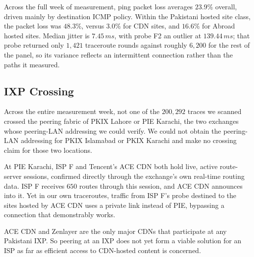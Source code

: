 \documentclass[sigconf,anonymous,10pt]{acmart}
\begin{document}
Across the full week of measurement, ping packet loss averages $23.9\%$ overall, driven mainly by destination ICMP policy. Within the Pakistani hosted site class, the packet loss was $48.3\%$, versus $3.0\%$ for CDN sites, and $16.6\%$ for Abroad hosted sites. Median jitter is $7.45\,ms$, with probe F2 an outlier at $139.44\,ms$; that probe returned only $1{,}421$ traceroute rounds against roughly $6{,}200$ for the rest of the panel, so its variance reflects an intermittent connection rather than the paths it measured.





\subsection{IXP Crossing }
\label{sec:rq1}

Across the entire measurement week, not one of the $200,292$ traces we scanned crossed the peering fabric of PKIX Lahore or PIE Karachi, the two exchanges whose peering-LAN addressing we could verify. We could not obtain the peering-LAN addressing for PKIX Islamabad or PKIX Karachi and make no crossing claim for those two locations. %

At PIE Karachi, ISP F and Tencent's ACE CDN both hold live, active route-server sessions, confirmed directly through the exchange's own real-time routing data. ISP F receives $650$ routes through this session, and ACE CDN announces into it. Yet in our own traceroutes, traffic from ISP F's probe destined to the sites hosted by ACE CDN uses a private link instead of PIE, bypassing a connection that demonstrably works.

ACE CDN and Zenlayer are the only major CDNs that participate at any Pakistani IXP. So peering at an IXP does not yet form a viable solution for an ISP as far as efficient access to CDN-hosted content is concerned.
\end{document}

